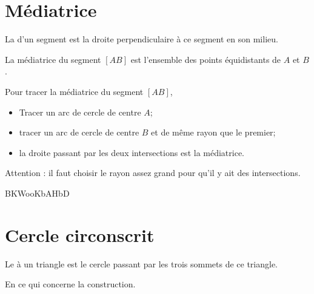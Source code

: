 
\section{Médiatrice}

\begin{definition}
    La  d'un segment est la droite perpendiculaire à ce segment en son milieu.
\end{definition}

\begin{center}
   
\end{center}

\begin{Aretenir}
    La médiatrice du segment \( [AB]\) est l'ensemble des points équidistants de \( A\) et \( B\).
\end{Aretenir}


Pour tracer la médiatrice du segment \( [AB]\), 
\begin{itemize}
    \item Tracer un arc de cercle de centre \( A\);
    \item tracer un arc de cercle de centre \( B\) et de même rayon que le premier;
    \item la droite passant par les deux intersections est la médiatrice.
\end{itemize}
Attention : il faut choisir le rayon assez grand pour qu'il y ait des intersections.

BKWooKbAHbD


\section{Cercle circonscrit}

\begin{definition}
    Le  à un triangle est le cercle passant par les trois sommets de ce triangle.
\end{definition}


\begin{center}
   
\end{center}

En ce qui concerne la construction.

\begin{center}
   
\end{center}


